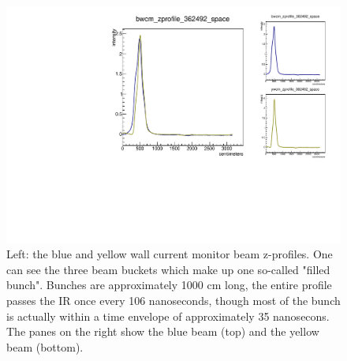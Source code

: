 \begin{figure}
\begin{center}
\includegraphics[width=\linewidth,height=\textheight,keepaspectratio]{../HourglassCorrection/figs/362492_wcm_zprofile}
\caption{ 
Left: the blue and yellow wall current monitor beam z-profiles. One can see the
three beam buckets which make up one so-called "filled bunch". Bunches are
approximately 1000 cm long, the entire profile passes the IR once every 106
nanoseconds, though most of the bunch is actually within a time envelope of
approximately 35 nanosecons. The panes on the right show the blue beam (top)
and the yellow beam (bottom).
}
\label{fig:362492_wcm_zprofile}
\end{center}
\end{figure}
